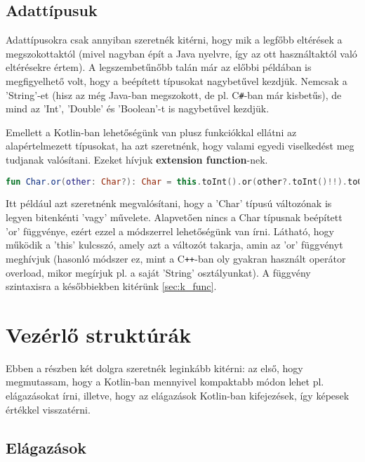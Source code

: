 \subsection{Adattípusuk}
\label{subsec:k_tyes}

Adattípusokra csak annyiban szeretnék kitérni, hogy mik a legfőbb eltérések a megszokottaktól (mivel nagyban épít a Java nyelvre, így az ott használtaktól való eltérésekre értem). A legszembetűnőbb talán már az előbbi példában is megfigyelhető volt, hogy a beépített típusokat nagybetűvel kezdjük. Nemcsak a 'String'-et (hisz az még Java-ban megszokott, de pl. C\verb|#|-ban már kisbetűs), de mind az 'Int', 'Double' és 'Boolean'-t is nagybetűvel kezdjük.

Emellett a Kotlin-ban lehetőségünk van plusz funkciókkal ellátni az alapértelmezett típusokat, ha azt szeretnénk, hogy valami egyedi viselkedést meg tudjanak valósítani. Ezeket hívjuk \textbf{extension function}-nek. 
\scriptsize
\begin{lstlisting}[language = Kotlin]
	fun Char.or(other: Char?): Char = this.toInt().or(other?.toInt()!!).toChar()
\end{lstlisting}
\normalsize
Itt például azt szeretnénk megvalósítani, hogy a 'Char' típusú változónak is legyen bitenkénti 'vagy' művelete. Alapvetően nincs a Char típusnak beépített 'or' függvénye, ezért ezzel a módszerrel lehetőségünk van írni. Látható, hogy működik a 'this' kulcsszó, amely azt a változót takarja, amin az 'or' függvényt meghívjuk (hasonló módszer ez, mint a C\verb|++|-ban oly gyakran használt operátor overload, mikor megírjuk pl. a saját 'String' osztályunkat). A függvény szintaxisra a későbbiekben kitérünk \ref{sec:k_func}.

\newpage
\section{Vezérlő struktúrák}
\label{sec:k_control}

Ebben a részben két dolgra szeretnék leginkább kitérni: az első, hogy megmutassam, hogy a Kotlin-ban mennyivel kompaktabb módon lehet pl. elágazásokat írni, illetve, hogy az elágazások Kotlin-ban kifejezések, így képesek értékkel visszatérni.

\subsection{Elágazások}
\label{subsec:k_stat}

